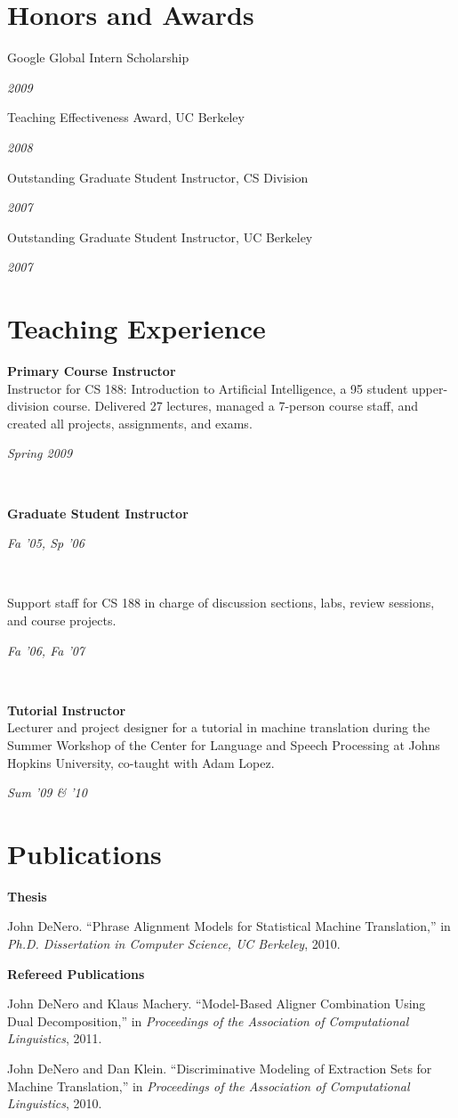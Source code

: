 \documentclass[margin,line]{res}
\newcommand{\dated}[2]{\parbox[t]{4.4in}{#1} \hspace{0.4in}
											 \parbox[t]{1in}{ {\it #2 } } }
\begin{document}
\begin{resume}
\section{\sc Honors and Awards} 
\dated{Google Global Intern Scholarship} { 2009 }

\dated{Teaching Effectiveness Award, UC Berkeley} { 2008 }

\dated{Outstanding Graduate Student Instructor, CS Division} { 2007 }

\dated{Outstanding Graduate Student Instructor, UC Berkeley} { 2007 }

\section{\sc Teaching Experience}
\dated{ {\bf Primary Course Instructor}\\
Instructor for CS 188: Introduction to Artificial Intelligence, a 95 student
upper-division course. Delivered 27 lectures, managed a 7-person course staff,
and created all projects, assignments, and exams.} {Spring 2009} \\

\dated{ {\bf Graduate Student Instructor}}{Fa '05, Sp '06}\\
\dated{ Support staff for CS 188 in charge of discussion sections, labs, review
sessions, and course projects.}
{Fa '06, Fa '07} \\

\dated{ {\bf Tutorial Instructor }\\
Lecturer and project designer for a tutorial in machine translation during the
Summer Workshop of the Center for Language and Speech Processing at Johns
Hopkins University, co-taught with Adam Lopez. }
{Sum '09 \& '10}

\section{\sc Publications}

{\bf Thesis }

John DeNero. ``Phrase Alignment Models for Statistical Machine Translation,'' in {\it Ph.D. Dissertation in Computer Science, UC Berkeley}, 2010. 

{\bf Refereed Publications }

John DeNero and Klaus Machery. ``Model-Based Aligner Combination Using Dual Decomposition,'' in {\it Proceedings of the Association of Computational Linguistics}, 2011. 

John DeNero and Dan Klein. ``Discriminative Modeling of Extraction Sets for Machine Translation,'' in {\it Proceedings of the Association of Computational Linguistics}, 2010. 


\end{resume}
\end{document}
